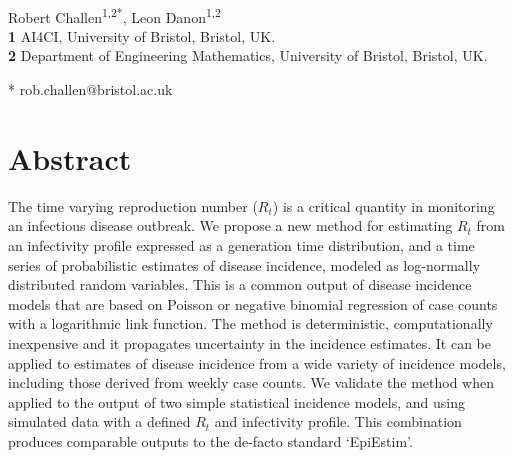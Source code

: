 \documentclass[10pt,letterpaper]{article}
\begin{document}
\vspace*{0.2in}

\begin{flushleft}
{\Large
\textbf{}
}
\newline
\\
Robert Challen\textsuperscript{1,2*},
Leon Danon\textsuperscript{1,2}
\\
\bigskip
\textbf{1} AI4CI, University of Bristol, Bristol, UK.\\
\textbf{2} Department of Engineering Mathematics, University of Bristol, Bristol, UK.\\
\bigskip

* rob.challen@bristol.ac.uk

\end{flushleft}
\section*{Abstract}

The time varying reproduction number ($R_t$) is a critical quantity in monitoring an infectious disease outbreak. We propose a new method for estimating $R_t$ from an infectivity profile expressed as a generation time distribution, and a time series of probabilistic estimates of disease incidence, modeled as log-normally distributed random variables. This is a common output of disease incidence models that are based on Poisson or negative binomial regression of case counts with a logarithmic link function. The method is deterministic, computationally inexpensive and it propagates uncertainty in the incidence estimates. It can be applied to estimates of disease incidence from a wide variety of incidence models, including those derived from weekly case counts. We validate the method when applied to the output of two simple statistical incidence models, and using simulated data with a defined $R_t$ and infectivity profile. This combination produces comparable outputs to the de-facto standard `EpiEstim'.

\end{document}
